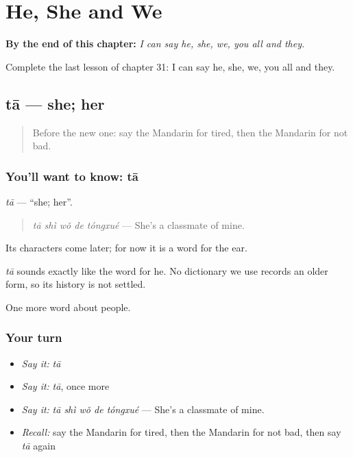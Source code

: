 
\chapter{He, She and We}
\label{ch:zh-he-she-and-we}

\begin{chapteropening}
\textbf{By the end of this chapter:} \emph{I can say he, she, we, you all and they.}

Complete the last lesson of chapter 31: I can say he, she, we, you all and they.
\end{chapteropening}

\section[tā]{tā — she; her}

\label{lesson:ZH-C31-ta-she}



\begin{quote}
Before the new one: say the Mandarin for tired, then the Mandarin for not bad.
\end{quote}

\subsection*{You'll want to know: tā}
\emph{tā} — \textquotedblleft{}she; her\textquotedblright{}.

\begin{quote}
\emph{tā shì wǒ de tóngxué} — She's a classmate of mine.
\end{quote}

Its characters come later; for now it is a word for the ear.

\begin{cousinweb}
\emph{tā} sounds exactly like the word for he. No dictionary we use records an older form, so its history is not settled.
\end{cousinweb}

\begin{grammarlens}[title={What you've built}]
One more word about people.
\end{grammarlens}

\subsection*{Your turn}
\begin{itemize}
\raggedright
  \item \emph{Say it:} \emph{tā}
  \item \emph{Say it:} \emph{tā}, once more
  \item \emph{Say it:} \emph{tā shì wǒ de tóngxué} — She's a classmate of mine.
  \item \emph{Recall:} say the Mandarin for tired, then the Mandarin for not bad, then say \emph{tā} again
\end{itemize}

